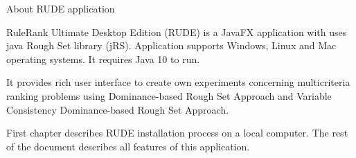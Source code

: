 \begin{Large}
	About RUDE application
\end{Large}
\newline

RuleRank Ultimate Desktop Edition (RUDE) is a JavaFX application with uses java Rough Set library (jRS). Application supports Windows, Linux and Mac operating systems. It requires Java 10 to run.
\newline

It provides rich user interface to create own experiments concerning multicriteria ranking problems using Dominance-based Rough Set Approach and Variable Consistency Dominance-based Rough Set Approach.
\newline

First chapter describes RUDE installation process on a local computer. The rest of the document describes all features of this application.

\vfill\newpage